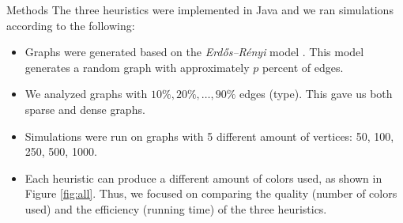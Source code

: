 \documentclass[final]{beamer}
\newlength{\twocolwid}
\newlength{\halfcolwid}
\begin{document}
\begin{frame}[t]
\begin{columns}[t]
\begin{column}{\twocolwid}
\begin{columns}
      \begin{column}{\halfcolwid}
        \vspace{-0.7cm}
        \begin{block}{Methods}
          The three heuristics were implemented in Java and we ran simulations according to the following:
          \begin{itemize}
            \setlength\itemsep{0.4em}
            \item Graphs were generated based on the \emph{Erdős–Rényi} model \cite{erdos}. This model generates a random graph with approximately $p$ percent of edges.
            \item We analyzed graphs with $10\%, 20\%, \ldots, 90\%$ edges (type). This gave us both sparse and dense graphs.
            \item Simulations were run on graphs with 5 different amount of vertices: 50, 100, 250, 500, 1000.
            \item Each heuristic can produce a different amount of colors used, as shown in Figure \ref{fig:all}. Thus, we focused on comparing the quality (number of colors used) and the efficiency (running time) of the three heuristics.
          \end{itemize}
        \end{block}
      \end{column}
    \end{columns}


\end{column}
\end{columns}
\end{frame}
\end{document}
